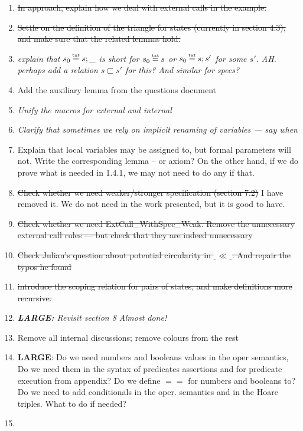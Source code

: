 \documentclass[acmsmall,review,anonymous]{acmart}\settopmatter{printfolios=true}
\begin{document}
\begin{enumerate}
\item
\st{In approach, explain how we deal with external calls in the  example.}
\item
\st{Settle on the definition of  the triangle for states (currently in section 4.3), and make sure that the related lemmas hold.}
\item
\sl{explain that $s_0\txteq s;\_$ is short for $s_0\txteq s$  or  $s_0\txteq s;s'$ for some $s'$. AH. perhaps add a relation $s \sqsubset s'$ for this? And similar for specs?}
\item
Add the auxiliary lemma from the questions document
\item
\sl{Unify the macros for external and internal}

\item
\sl{Clarify that sometimes we rely on implicit renaming of variables — say when}

\item
Explain that local variables may be assigned to, but formal parameters will not. Write the corresponding lemma -- or axiom?
On the other hand, if we do prove what is needed in 1.4.1, we may not need to do any if that.

\item
\st{Check whether we need weaker/stronger specification (section 7.2)} I have removed it. We do not need in the work presented, but it is good to have.

\item
\st{Check whether we need ExtCall\_WithSpec\_Weak. Remove the unnecessary external call rules — but check that they are indeed unnecessary}

\item
\st{Check Julian's question about potential circularity in $\_\ll\_$. And repair the typos he found}
\item
\st{introduce the scoping relation for pairs of states, and make definitions more recursive.}

\item
\sl{\textbf{LARGE:} Revisit section 8} Almost done!

\item
Remove all internal discussions; remove colours from the rest

\item

\textbf{LARGE}: Do we need numbers and booleans values in the oper semantics, 
Do we need them in the syntax of predicates assertions and for predicate execution from appendix?
Do we define $==$ for numbers and booleans to?  
Do we need to add conditionals in the oper. semantics and in the Hoare triples. What to do if needed?
\item


\end{enumerate}
\end{document}

